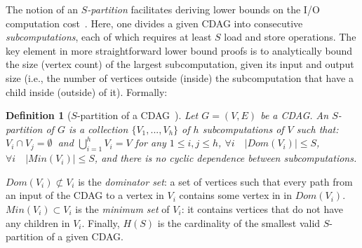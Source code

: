 \documentclass[sigplan,review,anonymous]{acmart}\settopmatter{printfolios=true,printccs=false,printacmref=false}
\newtheorem{defn}{Definition}
\newcommand{\macb}[1]{\textbf{\textsf{#1}}}
\begin{document}
The notion of an \emph{$S$-partition} facilitates deriving lower bounds on the
I/O computation cost~\cite{redblue}. Here, one divides a given CDAG into
consecutive \emph{subcomputations}, each of which requires at least $S$ load 
and store
operations. The key element in more straightforward
lower bound proofs is to analytically bound the size (vertex count) of
the largest subcomputation, given its input and output size (i.e., the number
of vertices outside (inside) the subcomputation that have a child inside
(outside) of it). 
%
%
%
%
%
Formally:

\begin{defn}[$S$-partition of a CDAG~\cite{redblue}] \label{df:s-partition}
	Let $G = (V,E)$ be a CDAG. An $S$-partition of $G$ is a collection $\{V_1, 
	...,
	V_h\}$ of $h$ subcomputations of $ V$ such that:  $V_i \cap V_j
	=\emptyset\ $ and $\bigcup_{i=1}^{h} V_i=V$ for any $1 \le i,j \le h$,
	 $\forall i\quad |Dom(V_i)| \le S$,  $\forall i\quad
	|Min(V_i)| \le S$, and  there is no cyclic dependence between
	subcomputations.
\end{defn}

$Dom(V_i) \not \subset V_i$ is the \emph{dominator set}: a set of vertices such 
that
every path from an input of the CDAG to a vertex in $V_i$ contains some 
vertex in in
$Dom(V_i)$.
%
$Min(V_i) \subset V_i$ is the \emph{minimum set} of $V_i$: it contains vertices
that do not have any children in $V_i$. 
%
%
Finally, $H(S)$ is the cardinality of the smallest valid $S$-partition of a
given CDAG.
\end{document}
